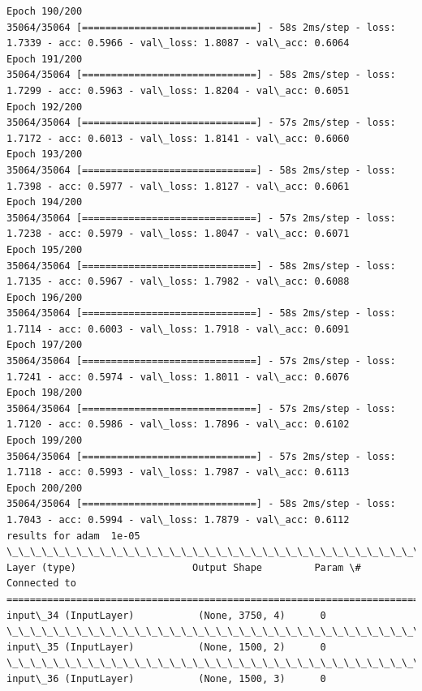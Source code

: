 \documentclass[11pt]{article}
\begin{document}
\begin{Verbatim}[commandchars=\\\{\}]
Epoch 190/200
35064/35064 [==============================] - 58s 2ms/step - loss: 1.7339 - acc: 0.5966 - val\_loss: 1.8087 - val\_acc: 0.6064
Epoch 191/200
35064/35064 [==============================] - 58s 2ms/step - loss: 1.7299 - acc: 0.5963 - val\_loss: 1.8204 - val\_acc: 0.6051
Epoch 192/200
35064/35064 [==============================] - 57s 2ms/step - loss: 1.7172 - acc: 0.6013 - val\_loss: 1.8141 - val\_acc: 0.6060
Epoch 193/200
35064/35064 [==============================] - 58s 2ms/step - loss: 1.7398 - acc: 0.5977 - val\_loss: 1.8127 - val\_acc: 0.6061
Epoch 194/200
35064/35064 [==============================] - 57s 2ms/step - loss: 1.7238 - acc: 0.5979 - val\_loss: 1.8047 - val\_acc: 0.6071
Epoch 195/200
35064/35064 [==============================] - 58s 2ms/step - loss: 1.7135 - acc: 0.5967 - val\_loss: 1.7982 - val\_acc: 0.6088
Epoch 196/200
35064/35064 [==============================] - 58s 2ms/step - loss: 1.7114 - acc: 0.6003 - val\_loss: 1.7918 - val\_acc: 0.6091
Epoch 197/200
35064/35064 [==============================] - 57s 2ms/step - loss: 1.7241 - acc: 0.5974 - val\_loss: 1.8011 - val\_acc: 0.6076
Epoch 198/200
35064/35064 [==============================] - 57s 2ms/step - loss: 1.7120 - acc: 0.5986 - val\_loss: 1.7896 - val\_acc: 0.6102
Epoch 199/200
35064/35064 [==============================] - 57s 2ms/step - loss: 1.7118 - acc: 0.5993 - val\_loss: 1.7987 - val\_acc: 0.6113
Epoch 200/200
35064/35064 [==============================] - 58s 2ms/step - loss: 1.7043 - acc: 0.5994 - val\_loss: 1.7879 - val\_acc: 0.6112
results for adam  1e-05
\_\_\_\_\_\_\_\_\_\_\_\_\_\_\_\_\_\_\_\_\_\_\_\_\_\_\_\_\_\_\_\_\_\_\_\_\_\_\_\_\_\_\_\_\_\_\_\_\_\_\_\_\_\_\_\_\_\_\_\_\_\_\_\_\_\_\_\_\_\_\_\_\_\_\_\_\_\_\_\_\_\_\_\_\_\_\_\_\_\_\_\_\_\_\_\_\_\_
Layer (type)                    Output Shape         Param \#     Connected to                     
==================================================================================================
input\_34 (InputLayer)           (None, 3750, 4)      0                                            
\_\_\_\_\_\_\_\_\_\_\_\_\_\_\_\_\_\_\_\_\_\_\_\_\_\_\_\_\_\_\_\_\_\_\_\_\_\_\_\_\_\_\_\_\_\_\_\_\_\_\_\_\_\_\_\_\_\_\_\_\_\_\_\_\_\_\_\_\_\_\_\_\_\_\_\_\_\_\_\_\_\_\_\_\_\_\_\_\_\_\_\_\_\_\_\_\_\_
input\_35 (InputLayer)           (None, 1500, 2)      0                                            
\_\_\_\_\_\_\_\_\_\_\_\_\_\_\_\_\_\_\_\_\_\_\_\_\_\_\_\_\_\_\_\_\_\_\_\_\_\_\_\_\_\_\_\_\_\_\_\_\_\_\_\_\_\_\_\_\_\_\_\_\_\_\_\_\_\_\_\_\_\_\_\_\_\_\_\_\_\_\_\_\_\_\_\_\_\_\_\_\_\_\_\_\_\_\_\_\_\_
input\_36 (InputLayer)           (None, 1500, 3)      0                                            

\end{Verbatim}
\end{document}

